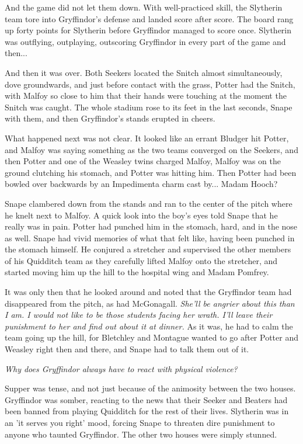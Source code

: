 \documentclass[a4paper,11pt]{article}
\begin{document}
And the game did not let them down. With well-practiced skill, the Slytherin team tore into Gryffindor's defense and landed score after score. The board rang up forty points for Slytherin before Gryffindor managed to score once. Slytherin was outflying, outplaying, outscoring Gryffindor in every part of the game and then...

And then it was over. Both Seekers located the Snitch almost simultaneously, dove groundwards, and just before contact with the grass, Potter had the Snitch, with Malfoy so close to him that their hands were touching at the moment the Snitch was caught. The whole stadium rose to its feet in the last seconds, Snape with them, and then Gryffindor's stands erupted in cheers.

What happened next was not clear. It looked like an errant Bludger hit Potter, and Malfoy was saying something as the two teams converged on the Seekers, and then Potter and one of the Weasley twins charged Malfoy, Malfoy was on the ground clutching his stomach, and Potter was hitting him. Then Potter had been bowled over backwards by an Impedimenta charm cast by... Madam Hooch?

Snape clambered down from the stands and ran to the center of the pitch where he knelt next to Malfoy. A quick look into the boy's eyes told Snape that he really was in pain. Potter had punched him in the stomach, hard, and in the nose as well. Snape had vivid memories of what that felt like, having been punched in the stomach himself. He conjured a stretcher and supervised the other members of his Quidditch team as they carefully lifted Malfoy onto the stretcher, and started moving him up the hill to the hospital wing and Madam Pomfrey.

It was only then that he looked around and noted that the Gryffindor team had disappeared from the pitch, as had McGonagall. \emph{She'll be angrier about this than I am. I would not like to be those students facing her wrath. I'll leave their punishment to her and find out about it at dinner.} As it was, he had to calm the team going up the hill, for Bletchley and Montague wanted to go after Potter and Weasley right then and there, and Snape had to talk them out of it.

\emph{Why does Gryffindor always have to react with physical violence?}

Supper was tense, and not just because of the animosity between the two houses. Gryffindor was somber, reacting to the news that their Seeker and Beaters had been banned from playing Quidditch for the rest of their lives. Slytherin was in an 'it serves you right' mood, forcing Snape to threaten dire punishment to anyone who taunted Gryffindor. The other two houses were simply stunned.
\end{document}

